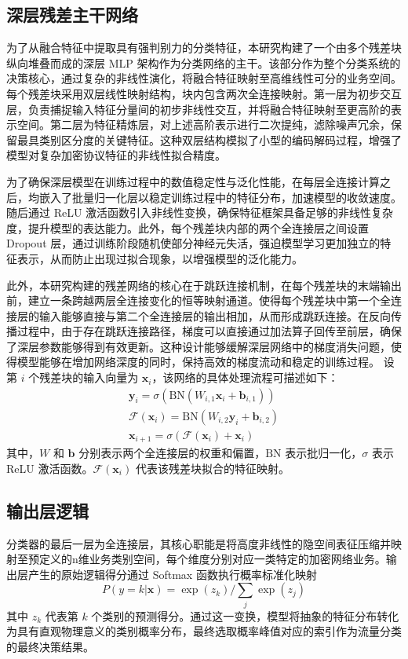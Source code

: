 \subsection{深层残差主干网络}
为了从融合特征中提取具有强判别力的分类特征，本研究构建了一个由多个残差块纵向堆叠而成的深层 MLP 架构作为分类网络的主干。该部分作为整个分类系统的决策核心，通过复杂的非线性演化，将融合特征映射至高维线性可分的业务空间。每个残差块采用双层线性映射结构，块内包含两次全连接映射。第一层为初步交互层，负责捕捉输入特征分量间的初步非线性交互，并将融合特征映射至更高阶的表示空间。第二层为特征精炼层，对上述高阶表示进行二次提纯，滤除噪声冗余，保留最具类别区分度的关键特征。这种双层结构模拟了小型的编码解码过程，增强了模型对复杂加密协议特征的非线性拟合精度。

为了确保深层模型在训练过程中的数值稳定性与泛化性能，在每层全连接计算之后，均嵌入了批量归一化层以稳定训练过程中的特征分布，加速模型的收敛速度。随后通过 ReLU 激活函数引入非线性变换，确保特征框架具备足够的非线性复杂度，提升模型的表达能力。此外，每个残差块内部的两个全连接层之间设置 Dropout 层，通过训练阶段随机使部分神经元失活，强迫模型学习更加独立的特征表示，从而防止出现过拟合现象，以增强模型的泛化能力。

此外，本研究构建的残差网络的核心在于跳跃连接机制，在每个残差块的末端输出前，建立一条跨越两层全连接变化的恒等映射通道。使得每个残差块中第一个全连接层的输入能够直接与第二个全连接层的输出相加，从而形成跳跃连接。在反向传播过程中，由于存在跳跃连接路径，梯度可以直接通过加法算子回传至前层，确保了深层参数能够得到有效更新。这种设计能够缓解深层网络中的梯度消失问题，使得模型能够在增加网络深度的同时，保持高效的梯度流动和稳定的训练过程。
设第 $i$ 个残差块的输入向量为 $\mathbf{x}_i$，该网络的具体处理流程可描述如下：
\begin{equation}
  \begin{gathered}
\mathbf{y}_i = \sigma(\text{BN}(W_{i,1} \mathbf{x}_i + \mathbf{b}_{i,1}))\\
\mathcal{F}(\mathbf{x}_i) = \text{BN}(W_{i,2} \mathbf{y}_i + \mathbf{b}_{i,2})\\
\mathbf{x}_{i+1} = \sigma(\mathcal{F}(\mathbf{x}_i) + \mathbf{x}_i)
  \end{gathered}
  \label{eq:residual}
\end{equation}
其中，$W$ 和 $\mathbf{b}$ 分别表示两个全连接层的权重和偏置，$\text{BN}$ 表示批归一化，$\sigma$ 表示 ReLU 激活函数。$\mathcal{F}(\mathbf{x}_i)$ 代表该残差块拟合的特征映射。

\subsection{输出层逻辑}
分类器的最后一层为全连接层，其核心职能是将高度非线性的隐空间表征压缩并映射至预定义的n维业务类别空间，每个维度分别对应一类特定的加密网络业务。输出层产生的原始逻辑得分通过 Softmax 函数执行概率标准化映射
\begin{equation}
  P(y=k | \mathbf{x}) = \exp(z_k) / \sum_{j} \exp(z_j)
  \label{eq:softmax}
\end{equation}
其中 $z_k$ 代表第 $k$ 个类别的预测得分。通过这一变换，模型将抽象的特征分布转化为具有直观物理意义的类别概率分布，最终选取概率峰值对应的索引作为流量分类的最终决策结果。

